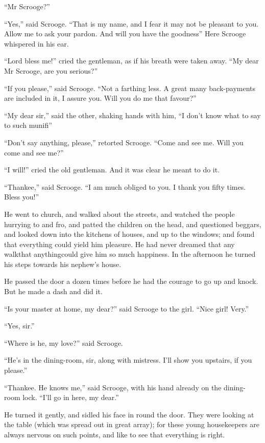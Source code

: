 \documentclass[paper=5.5in:8.5in,BCOR=7mm,twoside,DIV=calc,12pt,usegeometry]{scrbook} %
\begin{document}
\enquote{Mr Scrooge?}

\enquote{Yes,} said Scrooge. \enquote{That is my name, and I fear it may not be pleasant to you. Allow me to ask your pardon. And will you have the goodness\textemdash \textemdash } Here Scrooge whispered in his ear.

\enquote{Lord bless me!} cried the gentleman, as if his breath were taken away. \enquote{My dear Mr Scrooge, are you serious?}

\enquote{If you please,} said Scrooge. \enquote{Not a farthing less. A great many back-payments are included in it, I assure you. Will you do me that favour?}

\enquote{My dear sir,} said the other, shaking hands with him, \enquote{I don't know what to say to such munifi\textemdash \textemdash }

\enquote{Don't say anything, please,} retorted Scrooge. \enquote{Come and see me. Will you come and see me?}

\enquote{I will!} cried the old gentleman. And it was clear he meant to do it.

\enquote{Thankee,} said Scrooge. \enquote{I am much obliged to you. I thank you fifty times. Bless you!}

He went to church, and walked about the streets, and watched the people hurrying to and fro, and patted the children on the head, and questioned beggars, and looked down into the kitchens of houses, and up to the windows; and found that everything could yield him pleasure. He had never dreamed that any walk\textemdash that anything\textemdash could give him so much happiness. In the afternoon he turned his steps towards his nephew's house.

He passed the door a dozen times before he had the courage to go up and knock. But he made a dash and did it.

\enquote{Is your master at home, my dear?} said Scrooge to the girl. \enquote{Nice girl! Very.}

\enquote{Yes, sir.}

\enquote{Where is he, my love?} said Scrooge.

\enquote{He's in the dining-room, sir, along with mistress. I'll show you upstairs, if you please.}

\enquote{Thankee. He knows me,} said Scrooge, with his hand already on the dining-room lock. \enquote{I'll go in here, my dear.}

He turned it gently, and sidled his face in round the door. They were looking at the table (which was spread out in great array); for these young housekeepers are always nervous on such points, and like to see that everything is right.
\end{document}
